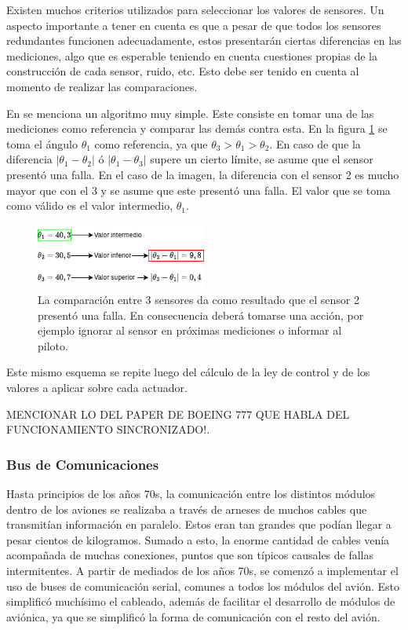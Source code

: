 Existen muchos criterios utilizados para seleccionar los valores de sensores. Un aspecto importante a tener en cuenta es que a pesar de que todos los sensores redundantes funcionen adecuadamente, estos presentarán ciertas diferencias en las mediciones, algo que es esperable teniendo en cuenta cuestiones propias de la construcción de cada sensor, ruido, etc. Esto debe ser tenido en cuenta al momento de realizar las comparaciones.

En \cite[p.~221]{collinson2023introduction} se menciona un algoritmo muy simple. Este consiste en tomar una de las mediciones como referencia y comparar las demás contra esta. En la figura \ref{fig:votacion_sensores} se toma el ángulo $\theta_1$ como referencia, ya que $\theta_3 > \theta_1 > \theta_2$. En caso de que la diferencia $| \theta_1 - \theta_2 |$ ó $| \theta_1 - \theta_3 |$ supere un cierto límite, se asume que el sensor presentó una falla. En el caso de la imagen, la diferencia con el sensor 2 es mucho mayor que con el 3 y se asume que este presentó una falla. El valor que se toma como válido es el valor intermedio, $\theta_1$.

\begin{figure}[H]
    \centering
    \includegraphics[width=0.5\textwidth]{img/votacion_sensores.png}
    \caption{La comparación entre 3 sensores da como resultado que el sensor 2 presentó una falla. En consecuencia deberá tomarse una acción, por ejemplo ignorar al sensor en próximas mediciones o informar al piloto.}
    \label{fig:votacion_sensores}
\end{figure}

Este mismo esquema se repite luego del cálculo de la ley de control y de los valores a aplicar sobre cada actuador.

{\color{red} MENCIONAR LO DEL PAPER DE BOEING 777 QUE HABLA DEL FUNCIONAMIENTO SINCRONIZADO!}.

\subsubsection{Bus de Comunicaciones}

Hasta principios de los años 70s, la comunicación entre los distintos módulos dentro de los aviones se realizaba a través de arneses de muchos cables que transmitían información en paralelo. Estos eran tan grandes que podían llegar a pesar cientos de kilogramos. Sumado a esto, la enorme cantidad de cables venía acompañada de muchas conexiones, puntos que son típicos causales de fallas intermitentes. A partir de mediados de los años 70s, se comenzó a implementar el uso de buses de comunicación serial, comunes a todos los módulos del avión. Esto simplificó muchísimo el cableado, además de facilitar el desarrollo de módulos de aviónica, ya que se simplificó la forma de comunicación con el resto del avión.

